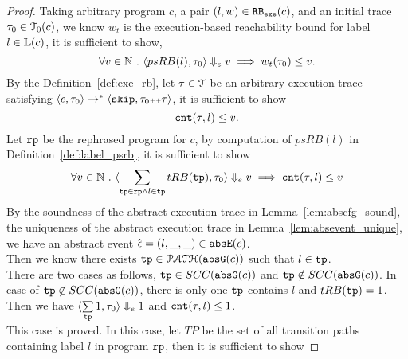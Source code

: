   \begin{proof}
        Taking arbitrary program $c$, a pair  $(l, w) \in \mathtt{RB_{exe}}(c)$, 
        and an initial trace $\mathtt{\tau}_0 \in \mathcal{T}_0(c)$,  
        we know $w_t$ is the execution-based 
        reachability bound 
        for label $l \in \mathbb{L}(c)$, 
        it is sufficient to show,
        \[
            \forall v \in \mathbb{N} ~.~ \langle psRB(l), \mathtt{\tau}_0 \rangle \Downarrow_e v
            \implies w_{t}(\mathtt{\tau}_0) \leq v.\]
        By the Definition~\ref{def:exe_rb}, 
        let $\mathtt{\tau} \in \mathcal{T}$ be an arbitrary execution trace 
        satisfying 
        $\langle {c}, \mathtt{\tau}_0 \rangle \to^{*} \langle \mathtt{skip}, \mathtt{\tau}_0 {\scriptscriptstyle ++} \mathtt{\tau} \rangle $,
        it is sufficient to show 
        \[
            \mathtt{cnt}(\mathtt{\tau}, l) \leq v.
        \]
        Let $\mathtt{rp}$ be the rephrased program for $c$,
        by computation of $psRB(l)$ in Definition~\ref{def:label_psrb}, it is sufficient to show 
        \[
          \forall v \in \mathbb{N} ~.~ 
          \langle \sum\limits_{\mathtt{tp} \in \mathtt{rp} \land 
          l \in \mathtt{tp}} tRB(\mathtt{tp}), \mathtt{\tau}_0
           \rangle \Downarrow_e v \implies  \mathtt{cnt}(\mathtt{\tau}, l) \leq v\]
          By the soundness of the abstract execution trace in Lemma~\ref{lem:abscfg_sound}, 
          the uniqueness of the abstract execution trace in Lemma~\ref{lem:absevent_unique},
          we have an abstract event $\hat{\mathtt{\epsilon}{}} = (l, \_, \_) \in \mathtt{abs}{\mathtt{E}}(c)$.
          \\
          Then we know there exists $\mathtt{tp} \in \mathcal{PATH}(\mathtt{abs}{\mathtt{G}}(c))$ such that 
          $l \in \mathtt{tp}$.
          \\
          There are two cases as follows,
        $\mathtt{tp} \in SCC(\mathtt{abs}{\mathtt{G}}(c))$ and $\mathtt{tp} \notin SCC(\mathtt{abs}{\mathtt{G}}(c))$.
          In case of  $\mathtt{tp} \not\in SCC(\mathtt{abs}{\mathtt{G}}(c))$, there is only one $\mathtt{tp}$ contains $l$ and $tRB(\mathtt{tp}) = 1$.
          \\
          Then we have $\langle \sum\limits_{\mathtt{tp}} 1, \mathtt{\tau}_0
           \rangle \Downarrow_e 1$ and $ \mathtt{cnt}(\mathtt{\tau}, l) \leq 1$.
          \\
          This case is proved.
          In this case, let $TP$ be the set of all transition paths containing 
          label $l$ in program $\mathtt{rp}$, then it is sufficient to show 

\end{proof}
